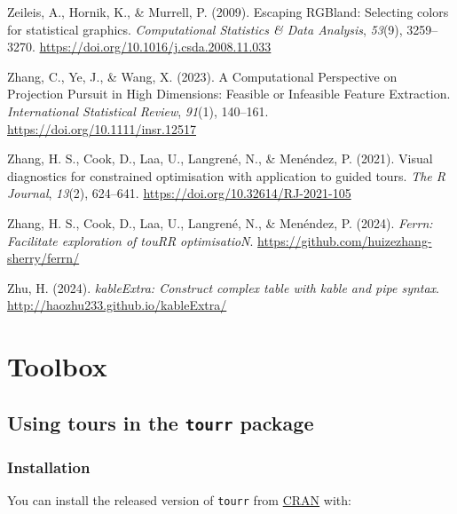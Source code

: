 \documentclass[
  letterpaper,
]{krantz}
\newlength{\cslhangindent}
\newenvironment{CSLReferences}[2] %
 {\begin{list}{}{%
  \setlength{\itemindent}{0pt}
  \setlength{\leftmargin}{0pt}
  \setlength{\parsep}{0pt}
  \ifodd #1
   \setlength{\leftmargin}{\cslhangindent}
   \setlength{\itemindent}{-1\cslhangindent}
  \fi
  \setlength{\itemsep}{#2\baselineskip}}}
 {\end{list}}
\begin{document}
\begin{CSLReferences}{1}{0}
Zeileis, A., Hornik, K., \& Murrell, P. (2009). Escaping {RGB}land:
Selecting colors for statistical graphics. \emph{Computational
Statistics \& Data Analysis}, \emph{53}(9), 3259--3270.
\url{https://doi.org/10.1016/j.csda.2008.11.033}

Zhang, C., Ye, J., \& Wang, X. (2023). A {C}omputational {P}erspective
on {P}rojection {P}ursuit in {H}igh {D}imensions: {F}easible or
{I}nfeasible {F}eature {E}xtraction. \emph{International Statistical
Review}, \emph{91}(1), 140--161.
\url{https://doi.org/10.1111/insr.12517}

Zhang, H. S., Cook, D., Laa, U., Langrené, N., \& Menéndez, P. (2021).
Visual diagnostics for constrained optimisation with application to
guided tours. \emph{The R Journal}, \emph{13}(2), 624--641.
\url{https://doi.org/10.32614/RJ-2021-105}

Zhang, H. S., Cook, D., Laa, U., Langrené, N., \& Menéndez, P. (2024).
\emph{Ferrn: Facilitate exploration of touRR optimisatioN}.
\url{https://github.com/huizezhang-sherry/ferrn/}

Zhu, H. (2024). \emph{kableExtra: Construct complex table with kable and
pipe syntax}. \url{http://haozhu233.github.io/kableExtra/}

\end{CSLReferences}

\cleardoublepage
{}
{}
\appendix

\chapter{Toolbox}\label{sec-toolbox}

\section{\texorpdfstring{Using tours in the \texttt{tourr}
package}{Using tours in the tourr package}}\label{using-tours-in-the-tourr-package}

\subsection{Installation}\label{installation}

You can install the released version of \texttt{tourr} from
\href{https://CRAN.R-project.org}{CRAN} with:
\end{document}
